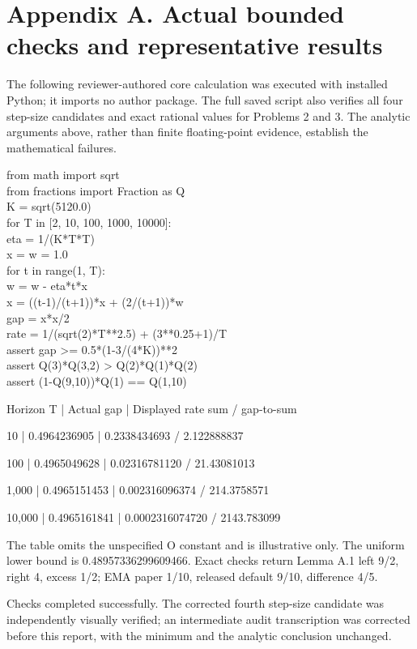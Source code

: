 \documentclass[10pt]{article}
\begin{document}
\section*{Appendix A. Actual bounded checks and representative results}
The following reviewer-authored core calculation was executed with installed Python; it imports no author package. The full saved script also verifies all four step-size candidates and exact rational values for Problems 2 and 3. The analytic arguments above, rather than finite floating-point evidence, establish the mathematical failures.\par
{\ttfamily\footnotesize from math import sqrt\\
from fractions import Fraction as Q\\
K = sqrt(5120.0)\\
for T in [2, 10, 100, 1000, 10000]:\\
    eta = 1/(K*T*T)\\
    x = w = 1.0\\
    for t in range(1, T):\\
        w = w - eta*t*x\\
        x = ((t-1)/(t+1))*x + (2/(t+1))*w\\
    gap = x*x/2\\
    rate = 1/(sqrt(2)*T**2.5) + (3**0.25+1)/T\\
    assert gap >= 0.5*(1-3/(4*K))**2\\
assert Q(3)*Q(3,2) > Q(2)*Q(1)*Q(2)\\
assert (1-Q(9,10))*Q(1) == Q(1,10)}\par
Horizon T | Actual gap | Displayed rate sum / gap-to-sum\par
10 | 0.4964236905 | 0.2338434693 / 2.122888837\par
100 | 0.4965049628 | 0.02316781120 / 21.43081013\par
1,000 | 0.4965151453 | 0.002316096374 / 214.3758571\par
10,000 | 0.4965161841 | 0.0002316074720 / 2143.783099\par
The table omits the unspecified O constant and is illustrative only. The uniform lower bound is 0.48957336299609466. Exact checks return Lemma A.1 left 9/2, right 4, excess 1/2; EMA paper 1/10, released default 9/10, difference 4/5.\par
Checks completed successfully. The corrected fourth step-size candidate was independently visually verified; an intermediate audit transcription was corrected before this report, with the minimum and the analytic conclusion unchanged.\par
\end{document}
